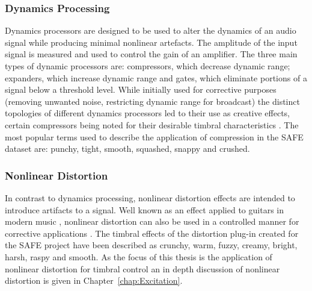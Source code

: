 		\subsubsection*{Dynamics Processing}
			Dynamics processors are designed to be used to alter the dynamics of an audio signal while
			producing minimal nonlinear artefacts. The amplitude of the input signal is measured and
			used to control the gain of an amplifier. The three main types of dynamic processors are:
			compressors, which decrease dynamic range; expanders, which increase dynamic range and gates, which
			eliminate portions of a signal below a threshold level. While initially used for corrective
			purposes (removing unwanted noise, restricting dynamic range for broadcast) the distinct topologies
			of different dynamics processors led to their use as creative effects, certain compressors being
			noted for their desirable timbral characteristics \citep{moore2016an}. The most popular terms used
			to describe the application of compression in the SAFE dataset are: punchy, tight, smooth,
			squashed, snappy and crushed.

		\subsubsection*{Nonlinear Distortion}
			In contrast to dynamics processing, nonlinear distortion effects are intended to introduce
			artifacts to a signal. Well known as an effect applied to guitars in modern music
			\citep{yeh2009digital}, nonlinear distortion can also be used in a controlled manner for corrective
			applications \citep{larsen2004audio}. The timbral effects of the distortion plug-in created for the
			SAFE project have been described as crunchy, warm, fuzzy, creamy, bright, harsh, raspy and smooth.
			As the focus of this thesis is the application of nonlinear distortion for timbral control an in
			depth discussion of nonlinear distortion is given in Chapter~\ref{chap:Excitation}. 
